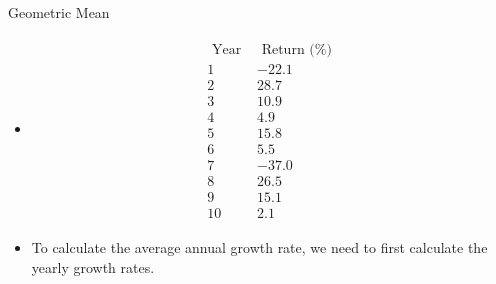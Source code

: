 \documentclass[8pt, usepdftitle=false]{beamer}
\begin{document}
\begin{frame}{Geometric Mean}

\begin{itemize}
\item[]

  \begin{table}
    \begin{align*}
      \begin{array}{cc}
  \text { Year } & \text { Return (\%) } \\
  1 & -22.1 \\
  2 & 28.7 \\
  3 & 10.9 \\
  4 & 4.9 \\
  5 & 15.8 \\
  6 & 5.5 \\
  7 & -37.0 \\
  8 & 26.5 \\
  9 & 15.1 \\
  10 & 2.1
  \end{array}
  \end{align*}
  \end{table}

  \item To calculate the average annual growth rate, we need to first calculate the yearly growth rates.


\end{itemize}
  

\end{frame}
\end{document}
